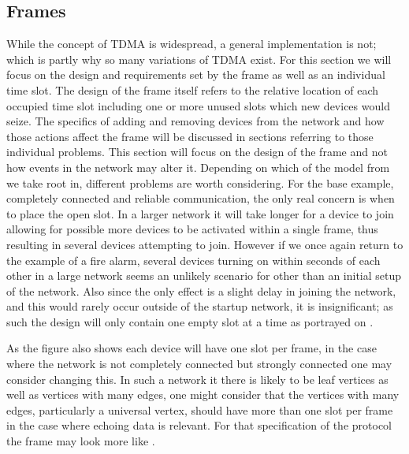 \subsection{Frames}
While the concept of TDMA is widespread, a general implementation is not; which is partly why so many variations of TDMA exist.
For this section we will focus on the design and requirements set by the frame as well as an individual time slot.
The design of the frame itself refers to the relative location of each occupied time slot including one or more unused slots which new devices would seize.
The specifics of adding and removing devices from the network and how those actions affect the frame will be discussed in sections referring to those individual problems.
This section will focus on the design of the frame and not how events in the network may alter it.
Depending on which of the model from  we take root in, different problems are worth considering.
For the base example, completely connected and reliable communication, the only real concern is when to place the open slot.
In a larger network it will take longer for a device to join allowing for possible more devices to be activated within a single frame, thus resulting in several devices attempting to join.
However if we once again return to the example of a fire alarm, several devices turning on within seconds of each other in a large network seems an unlikely scenario for other than an initial setup of the network.
Also since the only effect is a slight delay in joining the network, and this would rarely occur outside of the startup network, it is insignificant; as such the design will only contain one empty slot at a time as portrayed on .

\bigskip \noindent
As the figure also shows each device will have one slot per frame, in the case where the network is not completely connected but strongly connected one may consider changing this.
In such a network it there is likely to be leaf vertices as well as vertices with many edges, one might consider that the vertices with many edges, particularly a universal vertex, should have more than one slot per frame in the case where echoing data is relevant.
For that specification of the protocol the frame may look more like .

